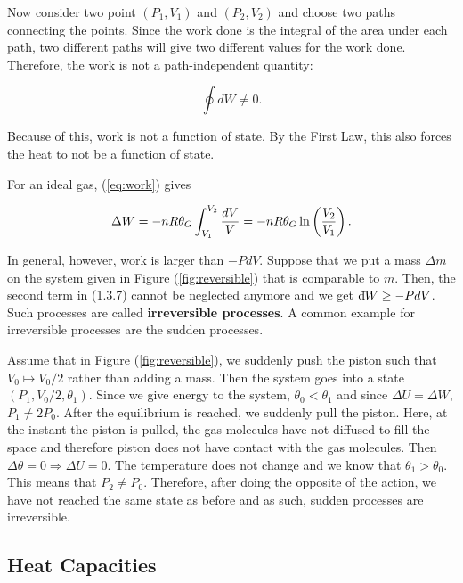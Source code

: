         Now consider two point $(P_1, V_1)$ and $(P_2, V_2)$ and choose two paths connecting the points. Since the work done is the integral of the area under each path, two different paths will give two different values for the work done. Therefore, the work is not a path-independent quantity:
        
        \begin{equation}
            \oint dW \neq 0.
        \end{equation}
        
        Because of this, work is not a function of state. By the First Law, this also forces the heat to not be a function of state.
        
        For an ideal gas, (\ref{eq:work}) gives
        
        \begin{equation}
            \Delta W = -nR\theta_G\int_{V_1}^{V_2}\frac{dV}{V} = -nR\theta_G\ln\left( \frac{V_2}{V_1} \right).
        \end{equation}
      
      In general, however, work is larger than $-PdV$. Suppose that we put a mass $\Delta m$ on the system given in Figure (\ref{fig:reversible}) that is comparable to $m$. Then, the second term in (1.3.7) cannot be neglected anymore and we get $\text{d}\hspace*{-0.13em}\bar{}\hspace*{0.1em} W \geq -PdV$. Such processes are called \textbf{irreversible processes}. A common example for irreversible processes are the sudden processes.
       
        Assume that in Figure (\ref{fig:reversible}), we suddenly push the piston such that $V_0\mapsto V_0/2$ rather than adding a mass. Then the system goes into a state $(P_1, V_0/2, \theta_1)$. Since we give energy to the system, $\theta_0<\theta_1$ and since $\Delta U = \Delta W$, $P_1\neq2P_0$. After the equilibrium is reached, we suddenly pull the piston. Here, at the instant the piston is pulled, the gas molecules have not diffused to fill the space and therefore piston does not have contact with the gas molecules. Then $\Delta\theta=0\Rightarrow\Delta U = 0$. The temperature does not change and we know that $\theta_1>\theta_0$. This means that $P_2\neq P_0$. Therefore, after doing the opposite of the action, we have not reached the same state as before and as such, sudden processes are irreversible.
    \subsection{Heat Capacities}
    \label{subsec:1.3.1Heatcapacities}
